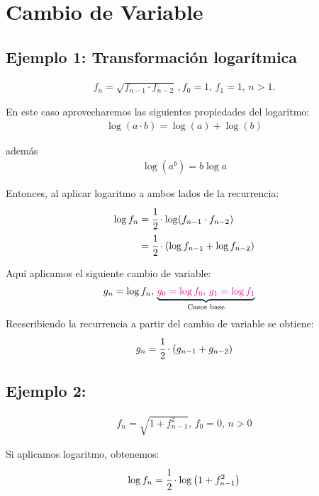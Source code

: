 \section{Cambio de Variable}

\subsection{Ejemplo 1: Transformación logarítmica}

\begin{align*}
f_n=\sqrt{f_{n-1}\cdot f_{n-2}}\,,f_0=1,\,f_1=1,\,n>1.
\end{align*}

En este caso aprovecharemos las siguientes propiedades del logaritmo:
\begin{align*}
\log(a\cdot b)=\log(a)+\log(b)
\end{align*}

además
\begin{align*}
\log(a^b)=b\log a
\end{align*}

Entonces, al aplicar logaritmo a ambos lados de la recurrencia:
\begin{align*}
\log f_n&=\cfrac{1}{2}\cdot \log (f_{n-1}\cdot f_{n-2})\\
&=\cfrac{1}{2}\cdot \left(\log f_{n-1}+\log{f_{n-2}}\right)
\end{align*}

Aquí aplicamos el siguiente cambio de variable:
\begin{align*}
g_n&=\log f_n,\,\underset{\text{Casos base}}{\underbrace{{\color{magenta} g_0=\log f_0,\,g_1=\log f_1}}}
\end{align*}
Reescribiendo la recurrencia a partir del cambio de variable se obtiene:
\begin{align*}
	g_n=\cfrac{1}{2}\cdot\left(g_{n-1}+g_{n-2}\right)
\end{align*}


\subsection{Ejemplo 2:}
\begin{align*}
f_n=\sqrt{1+f_{n-1}^2},\,f_0=0,\,n>0
\end{align*}

Si aplicamos logaritmo, obtenemos:
\begin{align*}
\log f_n=\cfrac{1}{2}\cdot \log\left(1+f_{n-1}^2\right)
\end{align*}

